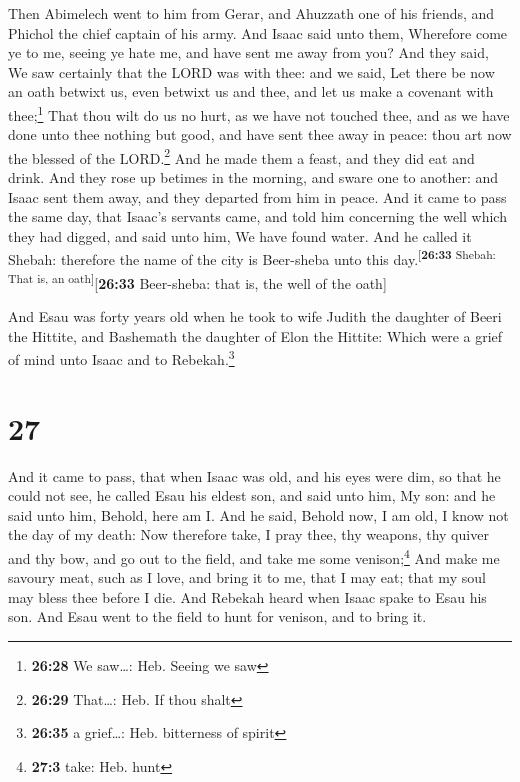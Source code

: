  Then Abimelech went to him from Gerar, and Ahuzzath one
of his friends, and Phichol the chief captain of his army.
 And Isaac said unto them, Wherefore come ye to me,
seeing ye hate me, and have sent me away from you?  And
they said, We saw certainly that the LORD was with thee: and we said,
Let there be now an oath betwixt us, even betwixt us and thee, and let
us make a covenant with thee;\footnote{\textbf{26:28} We saw\ldots: Heb.
  Seeing we saw}  That thou wilt do us no hurt, as we
have not touched thee, and as we have done unto thee nothing but good,
and have sent thee away in peace: thou art now the blessed of the
LORD.\footnote{\textbf{26:29} That\ldots: Heb. If thou shalt}
 And he made them a feast, and they did eat and drink.
 And they rose up betimes in the morning, and sware one
to another: and Isaac sent them away, and they departed from him in
peace.  And it came to pass the same day, that Isaac's
servants came, and told him concerning the well which they had digged,
and said unto him, We have found water.  And he called it
Shebah: therefore the name of the city is Beer-sheba unto this
day.\textsuperscript{{[}\textbf{26:33} Shebah: That is, an
oath{]}}{[}\textbf{26:33} Beer-sheba: that is, the well of the oath{]}

 And Esau was forty years old when he took to wife Judith
the daughter of Beeri the Hittite, and Bashemath the daughter of Elon
the Hittite:  Which were a grief of mind unto Isaac and
to Rebekah.\footnote{\textbf{26:35} a grief\ldots: Heb. bitterness of
  spirit}

\hypertarget{section-26}{%
\section{27}\label{section-26}}

 And it came to pass, that when Isaac was old, and his
eyes were dim, so that he could not see, he called Esau his eldest son,
and said unto him, My son: and he said unto him, Behold, here am I.
 And he said, Behold now, I am old, I know not the day of
my death:  Now therefore take, I pray thee, thy weapons,
thy quiver and thy bow, and go out to the field, and take me some
venison;\footnote{\textbf{27:3} take: Heb. hunt}  And make
me savoury meat, such as I love, and bring it to me, that I may eat;
that my soul may bless thee before I die.  And Rebekah
heard when Isaac spake to Esau his son. And Esau went to the field to
hunt for venison, and to bring it.

